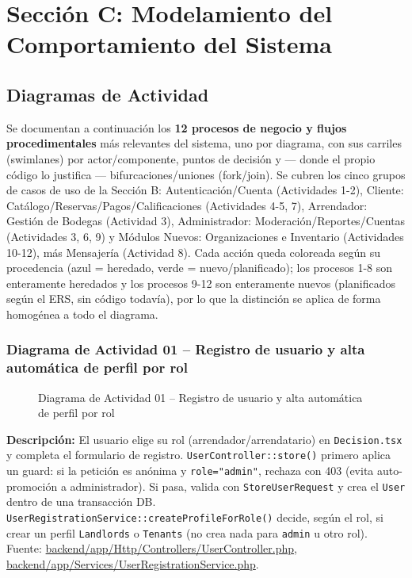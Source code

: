 \chapter{Sección C: Modelamiento del Comportamiento del Sistema}

\section{Diagramas de Actividad}
\noindent Se documentan a continuación los \textbf{12 procesos de negocio y flujos procedimentales} más relevantes del sistema, uno por diagrama, con sus carriles (swimlanes) por actor/componente, puntos de decisión y --- donde el propio código lo justifica --- bifurcaciones/uniones (fork/join). Se cubren los cinco grupos de casos de uso de la Sección B: Autenticación/Cuenta (Actividades 1-2), Cliente: Catálogo/Reservas/Pagos/Calificaciones (Actividades 4-5, 7), Arrendador: Gestión de Bodegas (Actividad 3), Administrador: Moderación/Reportes/Cuentas (Actividades 3, 6, 9) y Módulos Nuevos: Organizaciones e Inventario (Actividades 10-12), más Mensajería (Actividad 8). Cada acción queda coloreada según su procedencia (\colorbox{heredadobg}{azul} = heredado, \colorbox{nuevobg}{verde} = nuevo/planificado); los procesos 1-8 son enteramente heredados y los procesos 9-12 son enteramente nuevos (planificados según el ERS, sin código todavía), por lo que la distinción se aplica de forma homogénea a todo el diagrama.

\subsection{Diagrama de Actividad 01 -- Registro de usuario y alta automática de perfil por rol}
\begin{figure}[H]
    \centering
    \caption{Diagrama de Actividad 01 -- Registro de usuario y alta automática de perfil por rol}
    \label{fig:actividad01}
\end{figure}

{\sloppy\noindent\textbf{Descripción:} El usuario elige su rol (arrendador/arrendatario) en \texttt{Decision.tsx} y completa el formulario de registro. \texttt{UserController::store()} primero aplica un guard: si la petición es anónima y \texttt{role="admin"}, rechaza con 403 (evita auto-promoción a administrador). Si pasa, valida con \texttt{StoreUserRequest} y crea el \texttt{User} dentro de una transacción DB. \texttt{UserRegistrationService::createProfileForRole()} decide, según el rol, si crear un perfil \texttt{Landlords} o \texttt{Tenants} (no crea nada para \texttt{admin} u otro rol). Fuente: \url{backend/app/Http/Controllers/UserController.php}, \url{backend/app/Services/UserRegistrationService.php}.\par}

